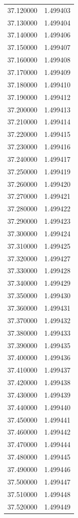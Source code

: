 \begin{tabular}{rr}
37.120000 & 1.499403 \\
37.130000 & 1.499404 \\
37.140000 & 1.499406 \\
37.150000 & 1.499407 \\
37.160000 & 1.499408 \\
37.170000 & 1.499409 \\
37.180000 & 1.499410 \\
37.190000 & 1.499412 \\
37.200000 & 1.499413 \\
37.210000 & 1.499414 \\
37.220000 & 1.499415 \\
37.230000 & 1.499416 \\
37.240000 & 1.499417 \\
37.250000 & 1.499419 \\
37.260000 & 1.499420 \\
37.270000 & 1.499421 \\
37.280000 & 1.499422 \\
37.290000 & 1.499423 \\
37.300000 & 1.499424 \\
37.310000 & 1.499425 \\
37.320000 & 1.499427 \\
37.330000 & 1.499428 \\
37.340000 & 1.499429 \\
37.350000 & 1.499430 \\
37.360000 & 1.499431 \\
37.370000 & 1.499432 \\
37.380000 & 1.499433 \\
37.390000 & 1.499435 \\
37.400000 & 1.499436 \\
37.410000 & 1.499437 \\
37.420000 & 1.499438 \\
37.430000 & 1.499439 \\
37.440000 & 1.499440 \\
37.450000 & 1.499441 \\
37.460000 & 1.499442 \\
37.470000 & 1.499444 \\
37.480000 & 1.499445 \\
37.490000 & 1.499446 \\
37.500000 & 1.499447 \\
37.510000 & 1.499448 \\
37.520000 & 1.499449 \\

\end{tabular}
